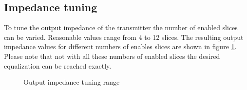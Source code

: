 \subsection{Impedance tuning}

To tune the output impedance of the transmitter the number of enabled slices can be varied. Reasonable values range from 4 to 12 slices. The resulting output impedance values for different numbers of enables slices are shown in figure \ref{fig:imp_tuning_tx}. Please note that not with all these numbers of enabled slices the desired equalization can be reached exactly.



\begin{figure}[H]
  \centering
  \caption{Output impedance tuning range}
  \label{fig:imp_tuning_tx}
\end{figure}

